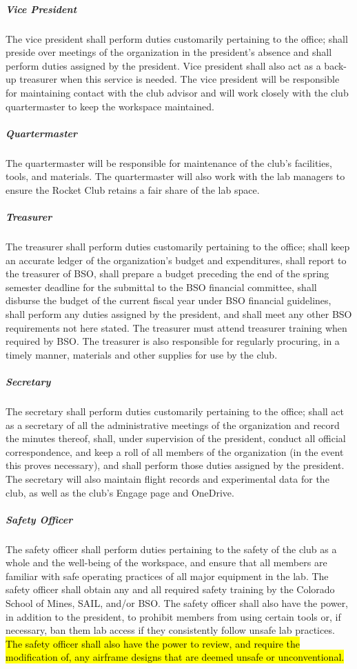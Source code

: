 \documentclass[12pt]{article}
\begin{document}
\subparagraph{Vice President} The vice president shall perform duties customarily pertaining to the office; 
shall preside over meetings of the organization in the president's absence and shall perform duties assigned by the president. 
Vice president shall also act as a back-up treasurer when this service is needed. 
The vice president will be responsible for maintaining contact with the club advisor and will work closely with the club quartermaster to keep the workspace maintained. 

\subparagraph{Quartermaster} The quartermaster will be responsible for maintenance of the club's facilities, tools, and materials. 
The quartermaster will also work with the lab managers to ensure the Rocket Club retains a fair share of the lab space.

\subparagraph{Treasurer} The treasurer shall perform duties customarily pertaining to the office; 
shall keep an accurate ledger of the organization's budget and expenditures, 
shall report to the treasurer of BSO, 
shall prepare a budget preceding the end of the spring semester deadline for the submittal to the BSO financial committee, 
shall disburse the budget of the current fiscal year under BSO financial guidelines, 
shall perform any duties assigned by the president, and shall meet any other BSO requirements not here stated. 
The treasurer must attend treasurer training when required by BSO. 
The treasurer is also responsible for regularly procuring, in a timely manner, 
materials and other supplies for use by the club. 

\subparagraph{Secretary} The secretary shall perform duties customarily pertaining to the office; 
shall act as a secretary of all the administrative meetings of the organization and record the minutes thereof, 
shall, under supervision of the president, conduct all official correspondence, 
and keep a roll of all members of the organization (in the event this proves necessary), 
and shall perform those duties assigned by the president. 
The secretary will also maintain flight records and experimental data for the club, 
as well as the club's Engage page and OneDrive.

\subparagraph{Safety Officer} The safety officer shall perform duties pertaining to the safety of the club as a whole and the well-being of the workspace, 
and ensure that all members are familiar with safe operating practices of all major equipment in the lab. 
The safety officer shall obtain any and all required safety training by the Colorado School of Mines, SAIL, and/or BSO. 
The safety officer shall also have the power, in addition to the president, 
to prohibit members from using certain tools or, if necessary, 
ban them lab access if they consistently follow unsafe lab practices.
\hl{
The safety officer shall also have the power to review, and require the modification of, any airframe designs that are deemed unsafe or unconventional.
}
\end{document}
